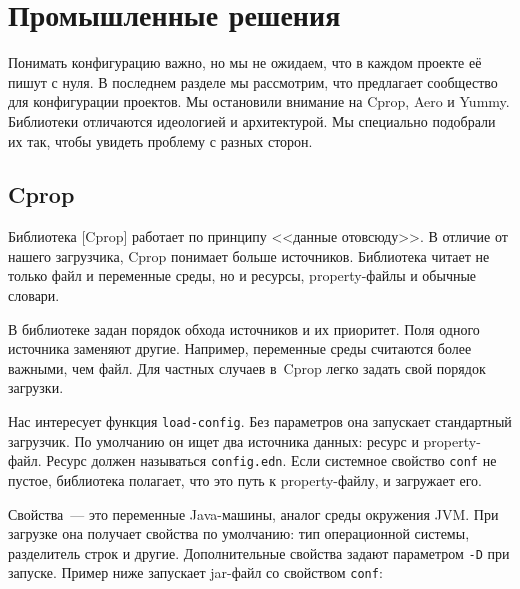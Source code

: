 \section{Промышленные решения}

Понимать конфигурацию важно, но мы не ожидаем, что в каждом проекте её пишут с
нуля. В последнем разделе мы рассмотрим, что предлагает сообщество для
конфигурации проектов. Мы остановили внимание на Cprop, Aero и Yummy. Библиотеки
отличаются идеологией и архитектурой. Мы специально подобрали их так, чтобы
увидеть проблему с разных сторон.

\subsection{Cprop}


Библиотека [Cprop] работает по принципу
<<данные отовсюду>>. В отличие от нашего загрузчика, Cprop понимает больше
источников. Библиотека читает не только файл и переменные среды, но и ресурсы,
property-файлы и обычные словари.

В библиотеке задан порядок обхода источников и их приоритет. Поля одного
источника заменяют другие. Например, переменные среды считаются более важными,
чем файл. Для частных случаев в~Cprop легко задать свой порядок загрузки.

Нас интересует функция \verb|load-config|. Без параметров она запускает
стандартный загрузчик. По умолчанию он ищет два источника данных: ресурс и
property-файл. Ресурс должен называться \verb|config.edn|. Если системное
свойство \verb|conf| не пустое, библиотека полагает, что это путь к
property-файлу, и загружает его.

Свойства~--- это переменные Java-машины, аналог среды окружения JVM. При загрузке
она получает свойства по умолчанию: тип операционной системы, разделитель строк
и другие. Дополнительные свойства задают параметром \verb|-D| при
запуске. Пример ниже запускает jar-файл со свойством \verb|conf|:


\ifx\devicetype\mobile

\begin{english}
\end{english}


